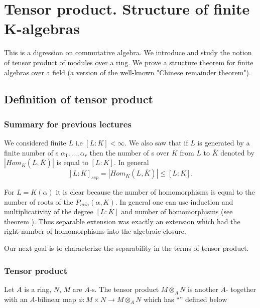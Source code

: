 \chapter{Tensor product. Structure of finite K-algebras}
This is a digression on commutative algebra. We introduce and study
the notion of tensor product of modules over a ring. We prove a
structure theorem for finite algebras over a field (a version of the
well-known "Chinese remainder theorem").


\section{Definition of tensor product}

\subsection{Summary for previous lectures}
We considered finite  $L$ i.e
$\left[L:K\right] < \infty$. We also saw that if
$L$ is generated by a finite number of s 
$\alpha_1, \dots, \alpha_r$ then the number of
s over $K$ from $L$ to $\bar{K}$ denoted by
$\left|Hom_K\left(L, \bar{K}\right)\right|$ is equal to
$\left[L:K\right]$. In general
\[
\left[L:K\right]_{sep} = 
\left|Hom_K\left(L, \bar{K}\right)\right| \le
\left[L:K\right].
\]

For $L = K\left(\alpha\right)$ it is clear because the number of
homomorphisms is equal to the number of roots of the
 $P_{min}\left(\alpha, K\right)$. In
general one can use induction and multiplicativity of the degree
$\left[L:K\right]$ and number of homomorphisms (see theorem
). Thus  separable extension was exactly an
extension  which had the right number of homomorphisms into the
algebraic closure.

Our next goal is to characterize the separability in the terms of
tensor product.

\subsection{Tensor product}

\begin{definition}
  Let $A$ is a ring, $N$, $M$ are $A$-s. The
  tensor product $M \otimes_A N$
  is another $A$- together with an
  $A$-bilinear map $\phi: M \times N \to M \otimes_A N$ which has
  ``'' defined below
  \label{def:tensorproduct}
\end{definition}

